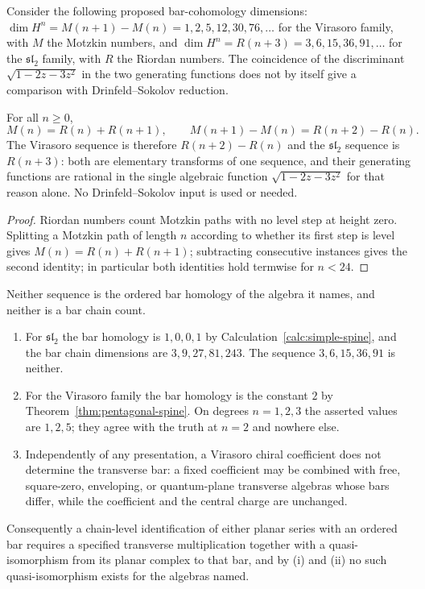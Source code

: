 Consider the following proposed bar-cohomology dimensions:
$\dim H^n=M(n+1)-M(n)=1,2,5,12,30,76,\dots$ for the Virasoro family, with $M$
the Motzkin numbers, and $\dim H^n=R(n+3)=3,6,15,36,91,\dots$ for the
$\mathfrak{sl}_2$ family, with $R$ the Riordan numbers. The coincidence of the
discriminant $\sqrt{1-2z-3z^2}$ in the two generating functions does not by
itself give a comparison with Drinfeld--Sokolov reduction.

\begin{proposition}
\label{prop:one-sequence-spine}
For all $n\ge0$,
\[
 M(n)=R(n)+R(n+1),
 \qquad
 M(n+1)-M(n)=R(n+2)-R(n).
\]
The Virasoro sequence is therefore $R(n+2)-R(n)$ and the $\mathfrak{sl}_2$
sequence is $R(n+3)$: both are elementary transforms of one sequence, and their
generating functions are rational in the single algebraic function
$\sqrt{1-2z-3z^2}$ for that reason alone. No Drinfeld--Sokolov input is used or
needed.
\end{proposition}
\begin{proof}
Riordan numbers count Motzkin paths with no level step at height zero.
Splitting a Motzkin path of length $n$ according to whether its first step is
level gives $M(n)=R(n)+R(n+1)$; subtracting consecutive instances gives the
second identity; in particular both identities hold termwise for $n<24$.
\end{proof}

\begin{theorem}
\label{thm:carrier-spine}
Neither sequence is the ordered bar homology of the algebra it names, and
neither is a bar chain count.
\begin{enumerate}
\item For $\mathfrak{sl}_2$ the bar homology is $1,0,0,1$ by
  Calculation~\ref{calc:simple-spine}, and the bar chain dimensions are
  $3,9,27,81,243$. The sequence $3,6,15,36,91$ is neither.
\item For the Virasoro family the bar homology is the constant $2$ by
  Theorem~\ref{thm:pentagonal-spine}. On degrees $n=1,2,3$ the asserted values
  are $1,2,5$; they agree with the truth at $n=2$ and nowhere else.
\item Independently of any presentation, a Virasoro chiral coefficient does not
  determine the transverse bar: a fixed coefficient may be combined with free,
  square-zero, enveloping, or quantum-plane transverse algebras whose bars
  differ, while the coefficient and the central charge are unchanged.
\end{enumerate}
Consequently a chain-level identification of either planar series with an
ordered bar requires a specified transverse multiplication together with a
quasi-isomorphism from its planar complex to that bar, and by (i) and (ii) no
such quasi-isomorphism exists for the algebras named.
\end{theorem}

